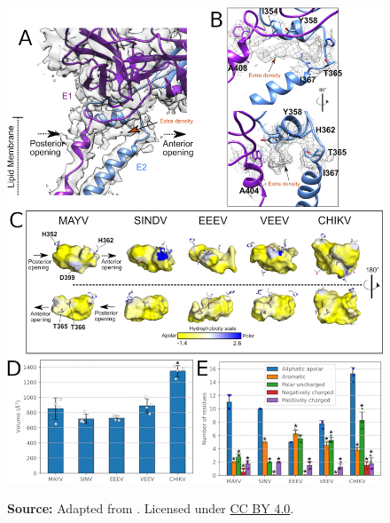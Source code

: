 \documentclass[Ingles]{phdthesis}
\begin{document}
\begin{figure}
  \centerline{\includegraphics[scale=0.35]{images/mayv-e1-e2.png}}
  \centerline{\tiny{\textbf{Source:} Adapted from \cite{ribeiro2021}. Licensed under \href{https://creativecommons.org/licenses/by/4.0/}{CC BY 4.0}.}}

\end{figure}
\end{document}
